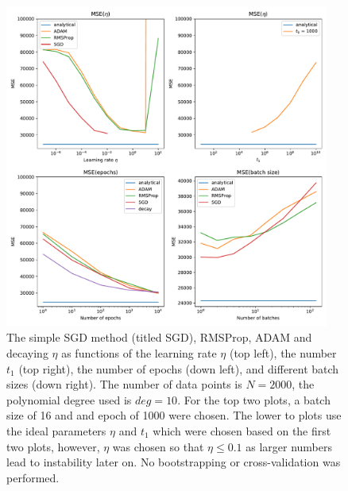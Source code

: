 \documentclass[11pt,a4paper,titlepage]{article}
\begin{document}
\begin{figure}[H]
\centering
\includegraphics[width=0.95\textwidth]{OLS_error_SGD_fixedLearningRate.pdf}
\caption[Test MSE Different SGD methods for OLS (fixed $\eta$)]{The simple SGD method (titled SGD), RMSProp, ADAM and decaying $\eta$ as functions of the learning rate $\eta$ (top left), the number $t_1$ (top right), the number of epochs (down left), and different batch sizes (down right). The number of data points is $N=2000$, the polynomial degree used is $deg=10$. For the top two plots, a batch size of 16 and and epoch of 1000 were chosen. The lower to plots use the ideal parameters $\eta$ and $t_1$ which were chosen based on the first two plots, however, $\eta$ was chosen so that $\eta \leq 0.1$ as larger numbers lead to instability later on. No bootstrapping or cross-validation was performed.}\label{fig:DifferentSGD_fixedEta}
\end{figure}
\end{document}
